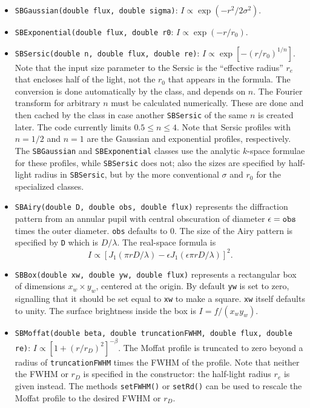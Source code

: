 \documentclass[11pt,preprint,flushrt]{aastex}
\begin{document}
\begin{itemize}
\item {\tt SBGaussian(double flux, double sigma)}: $I \propto \exp(-r^2/2\sigma^2)$.
\item {\tt SBExponential(double flux, double r0}: $I \propto \exp(-r/r_0)$.
\item {\tt SBSersic(double n, double flux, double re)}: $I \propto \exp[-(r/r_0)^{1/n}]$.  Note that the input size parameter to the Sersic is the ``effective radius'' $r_e$ that encloses half of the light, not the $r_0$ that appears in the formula.  The conversion is done automatically by the class, and depends on $n$.  The Fourier transform for arbitrary $n$ must be calculated numerically.  These are done and then cached by the class in case another {\tt SBSersic} of the same $n$ is created later.  The code currently limits $0.5\le n \le 4$.  Note that Sersic profiles with $n=1/2$ and $n=1$ are the Gaussian and exponential profiles, respectively.  The {\tt SBGaussian} and {\tt SBExponential} classes use the analytic $k$-space formulae for these profiles, while {\tt SBSersic} does not; also the sizes are specified by half-light radius in {\tt SBSersic}, but by the more conventional $\sigma$ and $r_0$ for the specialized classes.
\item {\tt SBAiry(double D, double obs, double flux)} represents the diffraction pattern from an annular pupil with central obscuration of diameter $\epsilon={\tt obs}$ times the outer diameter.  {\tt obs} defaults to 0.  The size of the Airy pattern is specified by {\tt D} which is $D/\lambda$.  The real-space formula is
\begin{equation}
I \propto \left[ J_1(\pi r D/\lambda) - \epsilon J_1(\epsilon \pi r D / \lambda) \right]^2.
\end{equation}
\item {\tt SBBox(double xw, double yw, double flux)} represents a rectangular box of dimensions $x_w \times y_w$, centered at the origin.  By default {\tt yw} is set to zero, signalling that it should be set equal to {\tt xw} to make a square.  {\tt xw} itself defaults to unity.  The surface brightness inside the box is $I=f/(x_wy_w)$.
\item {\tt SBMoffat(double beta, double truncationFWHM, double flux, double re)}: $I \propto [1+(r/r_D)^2]^{-\beta}$.  The Moffat profile is truncated to zero beyond a radius of {\tt truncationFWHM} times the FWHM of the profile.  Note that neither the FWHM or $r_D$ is specified in the constructor: the half-light radius $r_e$ is given instead.  The methods {\tt setFWHM()} or {\tt setRd()} can be used to rescale the Moffat profile to the desired FWHM or $r_D$.

\end{itemize}
\end{document}
